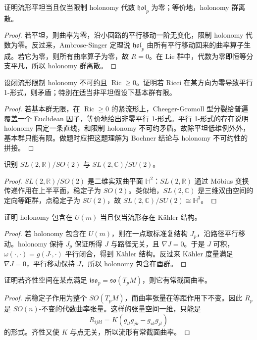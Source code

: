 \documentclass[11pt,a4paper,openany]{ctexbook}
\numberwithin{equation}{chapter}
\begin{document}
\begin{exercise}
证明流形平坦当且仅当限制 holonomy 代数 \(\mathfrak{hol}_p\) 为零；等价地，holonomy 群离散。
\end{exercise}
\begin{proof}
若平坦，则曲率为零，沿小回路的平行移动一阶无变化，限制 holonomy 代数为零。反过来，Ambrose-Singer 定理说 \(\mathfrak{hol}_p\) 由所有平行移动回来的曲率算子生成。若它为零，则所有曲率算子为零，故 \(R=0\)。在 Lie 群中，代数为零即恒等分支平凡，所以 holonomy 群离散。
\end{proof}

\begin{exercise}
设闭流形限制 holonomy 不可约且 \(\operatorname{Ric}\ge0\)。证明若 Ricci 在某方向为零导致平行 1-形式，则矛盾；特别在适当非平坦假设下基本群有限。
\end{exercise}
\begin{proof}
若基本群无限，在 \(\operatorname{Ric}\ge0\) 的紧流形上，Cheeger-Gromoll 型分裂给普遍覆盖一个 Euclidean 因子，等价地给出非零平行 1-形式。平行 1-形式的存在说明 holonomy 固定一条直线，和限制 holonomy 不可约矛盾。故除平坦低维例外外，基本群只能有限。做题时应把这题理解为 Bochner 结论与 holonomy 不可约性的拼接。
\end{proof}

\begin{exercise}
识别 \(SL(2,\mathbb R)/SO(2)\) 与 \(SL(2,\mathbb C)/SU(2)\)。
\end{exercise}
\begin{proof}
\(SL(2,\mathbb R)/SO(2)\) 是二维实双曲平面 \(\mathbb H^2\)：\(SL(2,\mathbb R)\) 通过 Möbius 变换传递作用在上半平面，稳定子为 \(SO(2)\)。类似地，\(SL(2,\mathbb C)\) 是三维双曲空间的定向等距群，点稳定子为 \(SU(2)\)，故 \(SL(2,\mathbb C)/SU(2)\cong\mathbb H^3\)。
\end{proof}

\begin{exercise}
证明 holonomy 包含在 \(U(m)\) 当且仅当流形存在 Kähler 结构。
\end{exercise}
\begin{proof}
若 holonomy 包含在 \(U(m)\)，则在一点取标准复结构 \(J_p\)，沿路径平行移动。holonomy 保持 \(J_p\) 保证所得 \(J\) 与路径无关，且 \(\nabla J=0\)。于是 \(J\) 可积，\(\omega(\cdot,\cdot)=g(J\cdot,\cdot)\) 平行闭合，得到 Kähler 结构。反过来 Kähler 度量满足 \(\nabla J=0\)，平行移动保持 \(J\)，所以 holonomy 包含在酉群。
\end{proof}

\begin{exercise}
证明若齐性空间在某点满足 \(\mathfrak{iso}_p=\mathfrak{so}(T_pM)\)，则它有常截面曲率。
\end{exercise}
\begin{proof}
点稳定子作用为整个 \(SO(T_pM)\)，而曲率张量在等距作用下不变。因此 \(R_p\) 是 \(SO(n)\)-不变的代数曲率张量。这样的张量空间一维，只能是
\[
R_{ijkl}=K(g_{il}g_{jk}-g_{ik}g_{jl})
\]
的形式。齐性又使 \(K\) 与点无关，所以流形有常截面曲率。
\end{proof}
\end{document}
